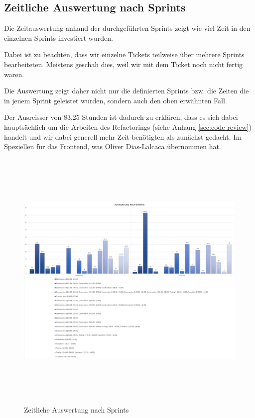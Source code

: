 \subsection{Zeitliche Auswertung nach Sprints}
Die Zeitauswertung anhand der durchgeführten Sprints zeigt wie viel Zeit in den einzelnen Sprints investiert wurden.

Dabei ist zu beachten, dass wir einzelne Tickets teilweise über mehrere Sprints bearbeiteten. Meistens geschah dies, weil wir mit dem Ticket noch nicht fertig waren.

Die Auswertung zeigt daher nicht nur die definierten Sprints bzw. die Zeiten die in jenem Sprint geleistet wurden, sondern auch den oben erwähnten Fall.

Der Ausreisser von 83.25 Stunden ist dadurch zu erklären, dass es sich dabei hauptsächlich um die Arbeiten des Refactorings (siehe Anhang \ref{sec:code-review}) handelt und wir dabei generell mehr Zeit benötigten als zunächst gedacht. Im Speziellen für das Frontend, was Oliver Dias-Lalcaca übernommen hat.

\begin{figure}[h]
  \centering
  \includegraphics[width=1\linewidth, height=13cm]{./img/zeitauswertung/ZeitauswertungSprints}
  \caption{Zeitliche Auswertung nach Sprints}
  \label{fig:comparison-sprints}
\end{figure}

